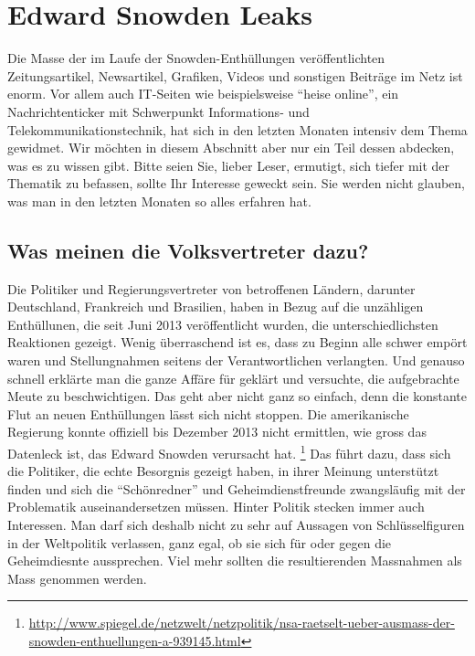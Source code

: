 \newpage
\section{Edward Snowden Leaks}
Die Masse der im Laufe der Snowden-Enthüllungen veröffentlichten Zeitungsartikel, Newsartikel, Grafiken, Videos und sonstigen Beiträge im Netz ist enorm. Vor allem auch IT-Seiten wie beispielsweise ``heise online'', ein Nachrichtenticker mit Schwerpunkt Informations- und Telekommunikationstechnik, hat sich in den letzten Monaten intensiv dem Thema gewidmet. Wir möchten in diesem Abschnitt aber nur ein Teil dessen abdecken, was es zu wissen gibt. Bitte seien Sie, lieber Leser, ermutigt, sich tiefer mit der Thematik zu befassen, sollte Ihr Interesse geweckt sein. Sie werden nicht glauben, was man in den letzten Monaten so alles erfahren hat.  

\subsection{Was meinen die Volksvertreter dazu?}
Die Politiker und Regierungsvertreter von betroffenen Ländern, darunter Deutschland, Frankreich und Brasilien, haben in Bezug auf die unzähligen Enthüllunen, die seit Juni 2013 veröffentlicht wurden, die unterschiedlichsten Reaktionen gezeigt. Wenig überraschend ist es, dass zu Beginn alle schwer empört waren und Stellungnahmen seitens der Verantwortlichen verlangten. Und genauso schnell erklärte man die ganze Affäre für geklärt und versuchte, die aufgebrachte Meute zu beschwichtigen. Das geht aber nicht ganz so einfach, denn die konstante Flut an neuen Enthüllungen lässt sich nicht stoppen. Die amerikanische Regierung konnte offiziell bis Dezember 2013 nicht ermittlen, wie gross das Datenleck ist, das Edward Snowden verursacht hat.
\footnote{\url{http://www.spiegel.de/netzwelt/netzpolitik/nsa-raetselt-ueber-ausmass-der-snowden-enthuellungen-a-939145.html}} 
Das führt dazu, dass sich die Politiker, die echte Besorgnis gezeigt haben, in ihrer Meinung unterstützt finden und sich die ``Schönredner'' und Geheimdienstfreunde zwangsläufig mit der Problematik auseinandersetzen müssen.
Hinter Politik stecken immer auch Interessen. Man darf sich deshalb nicht zu sehr auf Aussagen von Schlüsselfiguren in der Weltpolitik verlassen, ganz egal, ob sie sich für oder gegen die Geheimdiesnte aussprechen. Viel mehr sollten die resultierenden Massnahmen als Mass genommen werden.


